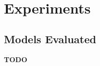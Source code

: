 \documentclass{article}
\begin{document}
%
%
%
%
%
%
%
%
%
\section{Experiments}
\label{sec:experiments}

\subsection{Models Evaluated}

\textbf{TODO}
%
%





\newpage

\end{document}
